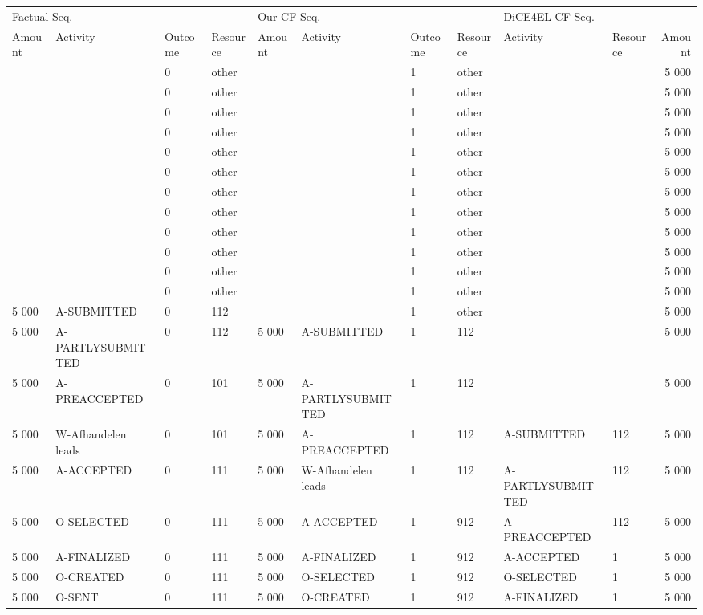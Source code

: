 \begin{tabular}{llllllllllr}
\toprule
\multicolumn{4}{l}{Factual Seq.} & \multicolumn{4}{l}{Our CF Seq.} & \multicolumn{3}{l}{DiCE4EL CF Seq.} \\
Amount & Activity & Outcome & Resource & Amount & Activity & Outcome & Resource & Activity & Resource & Amount \\
\midrule
 &  & 0 & other &  &  & 1 & other &  &  & 5 000 \\
 &  & 0 & other &  &  & 1 & other &  &  & 5 000 \\
 &  & 0 & other &  &  & 1 & other &  &  & 5 000 \\
 &  & 0 & other &  &  & 1 & other &  &  & 5 000 \\
 &  & 0 & other &  &  & 1 & other &  &  & 5 000 \\
 &  & 0 & other &  &  & 1 & other &  &  & 5 000 \\
 &  & 0 & other &  &  & 1 & other &  &  & 5 000 \\
 &  & 0 & other &  &  & 1 & other &  &  & 5 000 \\
 &  & 0 & other &  &  & 1 & other &  &  & 5 000 \\
 &  & 0 & other &  &  & 1 & other &  &  & 5 000 \\
 &  & 0 & other &  &  & 1 & other &  &  & 5 000 \\
 &  & 0 & other &  &  & 1 & other &  &  & 5 000 \\
5 000 & A-SUBMITTED & 0 & 112 &  &  & 1 & other &  &  & 5 000 \\
5 000 & A-PARTLYSUBMITTED & 0 & 112 & 5 000 & A-SUBMITTED & 1 & 112 &  &  & 5 000 \\
5 000 & A-PREACCEPTED & 0 & 101 & 5 000 & A-PARTLYSUBMITTED & 1 & 112 &  &  & 5 000 \\
5 000 & W-Afhandelen leads & 0 & 101 & 5 000 & A-PREACCEPTED & 1 & 112 & A-SUBMITTED & 112 & 5 000 \\
5 000 & A-ACCEPTED & 0 & 111 & 5 000 & W-Afhandelen leads & 1 & 112 & A-PARTLYSUBMITTED & 112 & 5 000 \\
5 000 & O-SELECTED & 0 & 111 & 5 000 & A-ACCEPTED & 1 & 912 & A-PREACCEPTED & 112 & 5 000 \\
5 000 & A-FINALIZED & 0 & 111 & 5 000 & A-FINALIZED & 1 & 912 & A-ACCEPTED & 1 & 5 000 \\
5 000 & O-CREATED & 0 & 111 & 5 000 & O-SELECTED & 1 & 912 & O-SELECTED & 1 & 5 000 \\
5 000 & O-SENT & 0 & 111 & 5 000 & O-CREATED & 1 & 912 & A-FINALIZED & 1 & 5 000 \\

\end{tabular}
